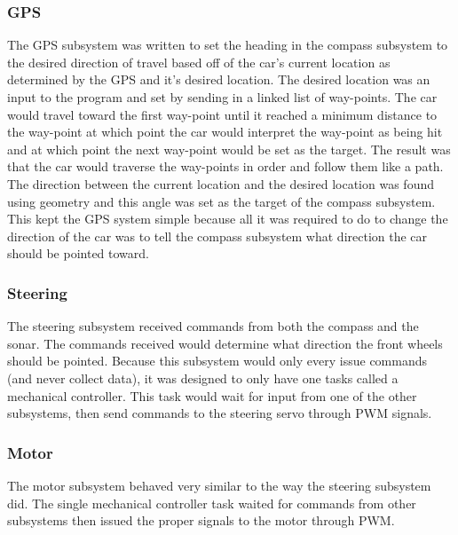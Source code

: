 \documentclass[final,letterpaper,singleside,12pt]{article}
\begin{document}
\subsubsection{GPS} %
\label{ssub:gps}
The GPS subsystem was written to set the heading in the compass subsystem to the desired direction of travel based off of the car's current location as determined by the GPS and it's desired location. The desired location was an input to the program and set by sending in a linked list of way-points. The car would travel toward the first way-point until it reached a minimum distance to the way-point at which point the car would interpret the way-point as being hit and at which point the next way-point would be set as the target. The result was that the car would traverse the way-points in order and follow them like a path. The direction between the current location and the desired location was found using geometry and this angle was set as the target of the compass subsystem. This kept the GPS system simple because all it was required to do to change the direction of the car was to tell the compass subsystem what direction the car should be pointed toward.

\subsubsection{Steering} %
\label{ssub:steering}
The steering subsystem received commands from both the compass and the sonar. The commands received would determine what direction the front wheels should be pointed. Because this subsystem would only every issue commands (and never collect data), it was designed to only have one tasks called a mechanical controller. This task would wait for input from one of the other subsystems, then send commands to the steering servo through PWM signals. 

\subsubsection{Motor} %
\label{ssub:motor}
The motor subsystem behaved very similar to the way the steering subsystem did. The single mechanical controller task waited for commands from other subsystems then issued the proper signals to the motor through PWM.


\pagebreak
\end{document}
